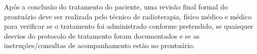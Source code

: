 \documentclass[11pt,a4paper]{article}
\begin{document}
	Após a conclusão do tratamento do paciente, uma revisão final formal do prontuário deve ser realizada pelo técnico de radioterapia, físico médico e médico para verificar se o tratamento foi administrado conforme pretendido, se quaisquer desvios do protocolo de tratamento foram documentados e se as instruções/consultas de acompanhamento estão no prontuário.



\end{document}

